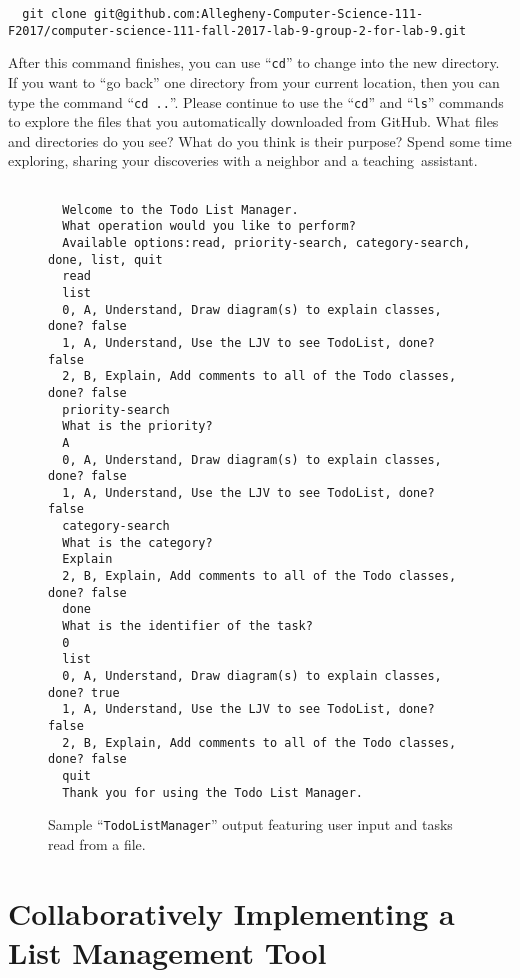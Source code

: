 \documentclass[11pt]{article}
\newcommand{\command}[1]{``\lstinline{#1}''}
\newcommand{\step}[1]{``{#1}''}
\begin{document}
\begin{lstlisting}
  git clone git@github.com:Allegheny-Computer-Science-111-F2017/computer-science-111-fall-2017-lab-9-group-2-for-lab-9.git
\end{lstlisting}

After this command finishes, you can use \command{cd} to change into the new directory. If you want to \step{go back}
one directory from your current location, then you can type the command \command{cd ..}. Please continue to use the
\command{cd} and \command{ls} commands to explore the files that you automatically downloaded from GitHub. What files
and directories do you see? What do you think is their purpose? Spend some time exploring, sharing your discoveries with
a neighbor and a \mbox{teaching assistant}.

\begin{figure}[tb]
  \begin{Verbatim}[commandchars=\\\{\}]

  Welcome to the Todo List Manager.
  What operation would you like to perform?
  Available options:read, priority-search, category-search, done, list, quit
  read
  list
  0, A, Understand, Draw diagram(s) to explain classes, done? false
  1, A, Understand, Use the LJV to see TodoList, done? false
  2, B, Explain, Add comments to all of the Todo classes, done? false
  priority-search
  What is the priority?
  A
  0, A, Understand, Draw diagram(s) to explain classes, done? false
  1, A, Understand, Use the LJV to see TodoList, done? false
  category-search
  What is the category?
  Explain
  2, B, Explain, Add comments to all of the Todo classes, done? false
  done
  What is the identifier of the task?
  0
  list
  0, A, Understand, Draw diagram(s) to explain classes, done? true
  1, A, Understand, Use the LJV to see TodoList, done? false
  2, B, Explain, Add comments to all of the Todo classes, done? false
  quit
  Thank you for using the Todo List Manager.
\end{Verbatim}
\vspace*{-.1in}
\caption{Sample ``{\tt TodoListManager}'' output featuring user input and tasks read from a file.}
\label{fig:output}
\end{figure}

\section*{Collaboratively Implementing a List Management Tool}
\end{document}

